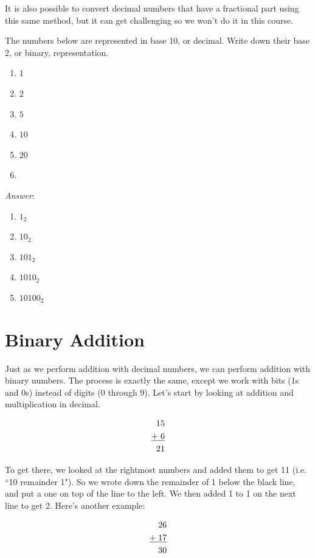 It is also possible to convert decimal numbers that have a fractional part using this same method, but it can get challenging so we won't do it in this course. 

\begin{example}
The numbers below are represented in base 10, or decimal. Write down their base 2, or binary, representation. 
\begin{enumerate}
\item $1$
\item $2$
\item $5$
\item $10$
\item $20$
\item 
\end{enumerate}
\noindent \emph{Answer}:
\begin{enumerate}
\item $1_{2}$
\item $10_{2}$
\item $101_{2}$
\item $1010_{2}$
\item $10100_{2}$
\end{enumerate}
\end{example}

\section{Binary Addition}
Just as we perform addition with decimal numbers, we can perform addition with
binary numbers. The process is exactly the same, except we work with bits (1s and 0s) instead of
digits (0 through 9). Let’s start by looking at addition and multiplication in decimal.

\begin{align*}
15&\\
\underline{+\hspace{1mm}6}&\\
21&\\
\end{align*}

To get there, we looked at the rightmost numbers and added them to get 11 (i.e. ``10 remainder 1"). So we wrote down the remainder of 1 below the black line, and put a one on top of the line to the left. We then added 1 to 1 on the next line to get 2. Here's another example: 

\begin{align*}
26&\\
\underline{+\hspace{1mm}17}&\\
30&\\
\end{align*}

